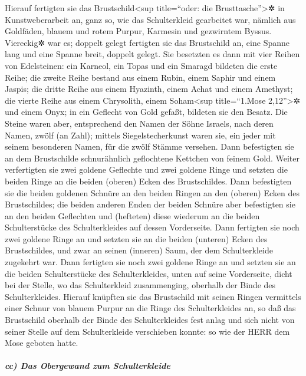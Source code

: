  Hierauf fertigten sie das Brustschild\textless sup
title=``oder: die Brusttasche''\textgreater✲ in Kunstweberarbeit an,
ganz so, wie das Schulterkleid gearbeitet war, nämlich aus Goldfäden,
blauem und rotem Purpur, Karmesin und gezwirntem Byssus. 
Viereckig✲ war es; doppelt gelegt fertigten sie das Brustschild an, eine
Spanne lang und eine Spanne breit, doppelt gelegt.  Sie
besetzten es dann mit vier Reihen von Edelsteinen: ein Karneol, ein
Topas und ein Smaragd bildeten die erste Reihe;  die
zweite Reihe bestand aus einem Rubin, einem Saphir und einem Jaspis;
 die dritte Reihe aus einem Hyazinth, einem Achat und
einem Amethyst;  die vierte Reihe aus einem Chrysolith,
einem Soham\textless sup title=``1.Mose 2,12''\textgreater✲ und einem
Onyx; in ein Geflecht von Gold gefaßt, bildeten sie den Besatz.
 Die Steine waren aber, entsprechend den Namen der Söhne
Israels, nach deren Namen, zwölf (an Zahl); mittels Siegelstecherkunst
waren sie, ein jeder mit seinem besonderen Namen, für die zwölf Stämme
versehen.  Dann befestigten sie an dem Brustschilde
schnurähnlich geflochtene Kettchen von feinem Gold. 
Weiter verfertigten sie zwei goldene Geflechte und zwei goldene Ringe
und setzten die beiden Ringe an die beiden (oberen) Ecken des
Brustschildes.  Dann befestigten sie die beiden goldenen
Schnüre an den beiden Ringen an den (oberen) Ecken des Brustschildes;
 die beiden anderen Enden der beiden Schnüre aber
befestigten sie an den beiden Geflechten und (hefteten) diese wiederum
an die beiden Schulterstücke des Schulterkleides auf dessen Vorderseite.
 Dann fertigten sie noch zwei goldene Ringe an und
setzten sie an die beiden (unteren) Ecken des Brustschildes, und zwar an
seinen (inneren) Saum, der dem Schulterkleide zugekehrt war.
 Dann fertigten sie noch zwei goldene Ringe an und
setzten sie an die beiden Schulterstücke des Schulterkleides, unten auf
seine Vorderseite, dicht bei der Stelle, wo das Schulterkleid
zusammenging, oberhalb der Binde des Schulterkleides. 
Hierauf knüpften sie das Brustschild mit seinen Ringen vermittels einer
Schnur von blauem Purpur an die Ringe des Schulterkleides an, so daß das
Brustschild oberhalb der Binde des Schulterkleides fest anlag und sich
nicht von seiner Stelle auf dem Schulterkleide verschieben konnte: so
wie der HERR dem Mose geboten hatte.

\hypertarget{cc-das-obergewand-zum-schulterkleide}{%
\subparagraph{cc) Das Obergewand zum
Schulterkleide}\label{cc-das-obergewand-zum-schulterkleide}}

